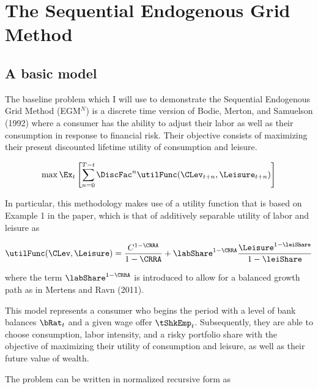 \documentclass[\econtexRoot/EGMN]{subfiles}
\begin{document}
\notinsubfile{\renewcommand{\econtexRoot}{.}}

\hypertarget{model}{}\par\section{The Sequential Endogenous Grid Method}
\notinsubfile{\label{sec:model}}

\subsection{A basic model}

The baseline problem which I will use to demonstrate the Sequential Endogenous Grid Method (EGM$^N$) is a discrete time version of Bodie, Merton, and Samuelson (1992) where a consumer has the ability to adjust their labor as well as their consumption in response to financial risk. Their objective consists of maximizing their present discounted lifetime utility of consumption and leisure.

\begin{equation}
    \max \Ex_{t} \left[ \sum_{n = 0}^{T-t} \DiscFac^{n} \utilFunc(\CLev_{t+n}, \Leisure_{t+n})  \right]
\end{equation}

In particular, this methodology makes use of a utility function that is based on Example 1 in the paper, which is that of additively separable utility of labor and leisure as

\begin{equation}
    \utilFunc(\CLev, \Leisure) = \frac{C^{1-\CRRA}}{1-\CRRA} + \labShare^{1-\CRRA} \frac{\Leisure^{1-\leiShare}}{1-\leiShare}
\end{equation}

where the term $\labShare^{1-\CRRA}$ is introduced to allow for a balanced growth path as in Mertens and Ravn (2011).

This model represents a consumer who begins the period with a level of bank balances $\bRat_{t}$ and a given wage offer $\tShkEmp_{t}$. Subsequently, they are able to choose consumption, labor intensity, and a risky portfolio share with the objective of maximizing their utility of consumption and leisure, as well as their future value of wealth.

The problem can be written in normalized recursive form as
\end{document}
